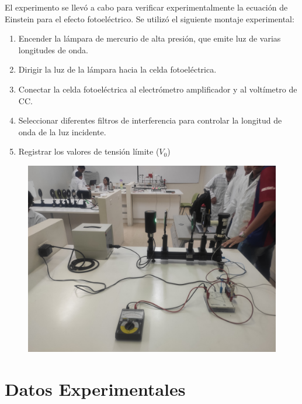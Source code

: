 \documentclass[letterpaper, 12pt]{article}
\begin{document}
El experimento se llevó a cabo para verificar
experimentalmente la ecuación de Einstein para el efecto
fotoeléctrico. Se utilizó el siguiente montaje
experimental:

\begin{enumerate}
      \item Encender la lámpara de mercurio de alta presión, que emite
            luz de varias longitudes de onda.
      \item Dirigir la luz de la lámpara hacia la celda fotoeléctrica.
      \item Conectar la celda fotoeléctrica al electrómetro
            amplificador y al voltímetro de CC\@{}.
      \item Seleccionar diferentes filtros de interferencia para
            controlar la longitud de onda de la luz incidente.
      \item Registrar los valores de tensión límite ($V_0$)
\end{enumerate}

\begin{figure}[H]
      \begin{center}
            \includegraphics[width=.5\linewidth]{Images/MontajeExperimental.jpeg}
            \caption{}
      \end{center}
\end{figure}

\section{Datos Experimentales}
\end{document}
